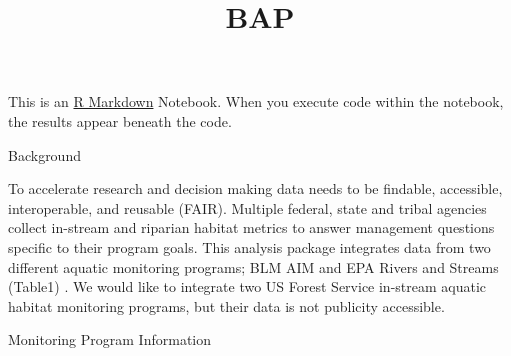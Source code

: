\documentclass[]{article}
\title{BAP}
\author{}
\date{}
\newenvironment{Shaded}{\begin{snugshade}}{\end{snugshade}}
\newcommand{\DataTypeTok}[1]{\textcolor[rgb]{0.13,0.29,0.53}{#1}}
\newcommand{\DecValTok}[1]{\textcolor[rgb]{0.00,0.00,0.81}{#1}}
\newcommand{\KeywordTok}[1]{\textcolor[rgb]{0.13,0.29,0.53}{\textbf{#1}}}
\newcommand{\NormalTok}[1]{#1}
\newcommand{\OperatorTok}[1]{\textcolor[rgb]{0.81,0.36,0.00}{\textbf{#1}}}
\newcommand{\OtherTok}[1]{\textcolor[rgb]{0.56,0.35,0.01}{#1}}
\newcommand{\StringTok}[1]{\textcolor[rgb]{0.31,0.60,0.02}{#1}}
\begin{document}
\maketitle

This is an \href{http://rmarkdown.rstudio.com}{R Markdown} Notebook.
When you execute code within the notebook, the results appear beneath
the code.

Background

To accelerate research and decision making data needs to be findable,
accessible, interoperable, and reusable (FAIR). Multiple federal, state
and tribal agencies collect in-stream and riparian habitat metrics to
answer management questions specific to their program goals. This
analysis package integrates data from two different aquatic monitoring
programs; BLM AIM and EPA Rivers and Streams (Table1) . We would like to
integrate two US Forest Service in-stream aquatic habitat monitoring
programs, but their data is not publicity accessible.

Monitoring Program Information

\begin{Shaded}
\end{Shaded}
\end{document}
